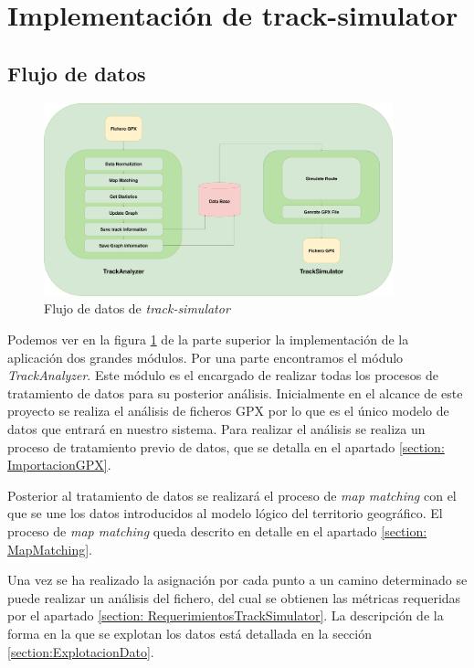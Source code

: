 \section{Implementación de track-simulator}
\subsection{Flujo de datos}
\begin{figure}[!htb]
\begin{center}
\includegraphics[width=0.9\textwidth]{./Imagenes/DataFlow}
\caption{Flujo de datos de 	\textit{track-simulator}}
\label{figure:TrackSimulatorDataFlow}
\end{center}
\end{figure}
Podemos ver en la figura \ref{figure:TrackSimulatorDataFlow} de la parte superior la 
implementación de la aplicación dos grandes módulos. Por una parte encontramos el 
módulo \textit{TrackAnalyzer}. Este módulo es el encargado de realizar todas los 
procesos de tratamiento de datos para su posterior análisis. Inicialmente en el alcance 
de este proyecto se realiza el análisis de ficheros \ac{GPX} por lo que es el único 
modelo de datos que entrará en nuestro sistema. Para realizar el análisis se realiza un 
proceso de tratamiento previo de datos, que se detalla en el apartado \ref{section: 
ImportacionGPX}.

Posterior al tratamiento de datos se realizará el proceso de \textit{map matching} con el 
que se une los datos introducidos al modelo lógico del territorio geográfico. El proceso 
de \textit{map matching} queda descrito en detalle en el apartado \ref{section: 
MapMatching}.

Una vez se ha realizado la asignación por cada punto a un camino determinado se 
puede realizar un análisis del fichero, del cual se obtienen las métricas requeridas por 
el apartado \ref{section: RequerimientosTrackSimulator}. La descripción de la forma en 
la que se explotan los datos está detallada en la sección \ref{section:ExplotacionDato}.

